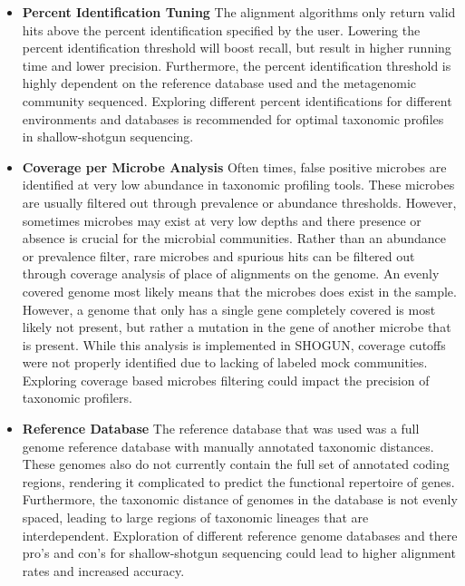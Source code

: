 \begin{itemize}
\item \textbf{Percent Identification Tuning} The alignment algorithms only return valid hits above the percent identification specified by the user. Lowering the percent identification threshold will boost recall, but result in higher running time and lower precision. Furthermore, the percent identification threshold is highly dependent on the reference database used and the metagenomic community sequenced. Exploring different percent identifications for different environments and databases is recommended for optimal taxonomic profiles in shallow-shotgun sequencing.

\item \textbf{Coverage per Microbe Analysis} Often times, false positive microbes are identified at very low abundance in taxonomic profiling tools. These microbes are usually filtered out through prevalence or abundance thresholds. However, sometimes microbes may exist at very low depths and there presence or absence is crucial for the microbial communities. Rather than an abundance or prevalence filter, rare microbes and spurious hits can be filtered out through coverage analysis of place of alignments on the genome. An evenly covered genome most likely means that the microbes does exist in the sample. However, a genome that only has a single gene completely covered is most likely not present, but rather a mutation in the gene of another microbe that is present. While this analysis is implemented in SHOGUN, coverage cutoffs were not properly identified due to lacking of labeled mock communities. Exploring coverage based microbes filtering could impact the precision of taxonomic profilers.

\item \textbf{Reference Database} The reference database that was used was a full genome reference database with manually annotated taxonomic distances. These genomes also do not currently contain the full set of annotated coding regions, rendering it complicated to predict the functional repertoire of genes. Furthermore, the taxonomic distance of genomes in the database is not evenly spaced, leading to large regions of taxonomic lineages that are interdependent. Exploration of different reference genome databases and there pro's and con's for shallow-shotgun sequencing could lead to higher alignment rates and increased accuracy.

\end{itemize}

